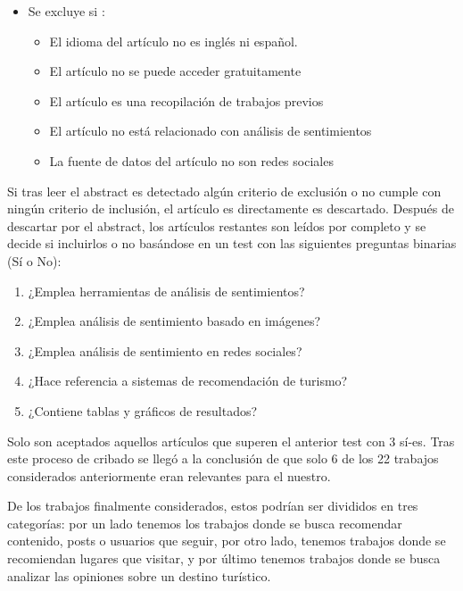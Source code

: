 \begin{enumerate}
\begin{itemize}
        \item Se excluye si :
        \begin{itemize}
            \item El idioma del artículo no es inglés ni español.
            \item El artículo no se puede acceder gratuitamente
            \item El artículo es una recopilación de trabajos previos
            \item El artículo no está relacionado con análisis de sentimientos
            \item La fuente de datos del artículo no son redes sociales
        \end{itemize}
    \end{itemize}

    Si tras leer el abstract es detectado algún criterio de exclusión o no cumple con ningún criterio de inclusión, el artículo es directamente es descartado. Después de descartar por el abstract, los artículos restantes son leídos por completo y se decide si incluirlos o no basándose en un test con las siguientes preguntas binarias (Sí o No):

    \begin{enumerate}
        \item ¿Emplea herramientas de análisis de sentimientos?
        \item ¿Emplea análisis de sentimiento basado en imágenes?
        \item ¿Emplea análisis de sentimiento en redes sociales?
        \item ¿Hace referencia a sistemas de recomendación de turismo?
        \item ¿Contiene tablas y gráficos de resultados?
    \end{enumerate}
    
    Solo son aceptados aquellos artículos que superen el anterior test con 3 sí-es. Tras este proceso de cribado se llegó a la conclusión de que solo 6 de los 22 trabajos considerados anteriormente eran relevantes para el nuestro.
\end{enumerate}

De los trabajos finalmente considerados, estos podrían ser divididos en tres categorías: por un lado tenemos los trabajos donde se busca recomendar contenido, posts o usuarios que seguir, por otro lado, tenemos trabajos donde se recomiendan lugares que visitar, y por último tenemos trabajos donde se busca analizar las opiniones sobre un destino turístico.\\


